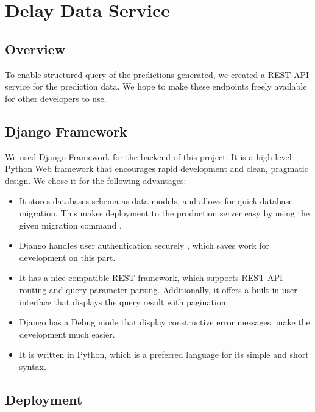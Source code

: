 \chapter{Delay Data Service}
\label{ch:data_service}
\section{Overview}
\par To enable structured query of the predictions generated, we created a REST API service for the prediction data. We hope to make these endpoints freely available for other developers to use.

\section{Django Framework}
\par We used Django Framework\cite{django_framework} for the backend of this project. It is a high-level Python Web framework that encourages rapid development and clean, pragmatic design. We chose it for the following advantages:

\begin{itemize}
  \item It stores databases schema as data models\cite{django_model}, and allows for quick database migration. This makes deployment to the production server easy by using the given migration command \cite{django_migrations}.
  \item Django handles user authentication securely \cite{django_user_auth}, which saves work for development on this part.
  \item It has a nice compatible REST framework\cite{django_rest}, which supports REST API routing\cite{django_rest_routing} and query parameter parsing. Additionally, it offers a built-in user interface that displays the query result with pagination\cite{django_rest_pagination}.
  \item Django has a Debug mode that display constructive error messages, make the development much easier.
  \item It is written in Python, which is a preferred language for its simple and short syntax.
\end{itemize}

\section{Deployment}

